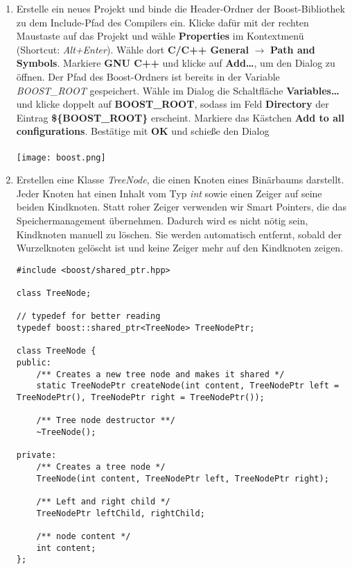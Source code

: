 \begin{enumerate}
\item
Erstelle ein neues Projekt und binde die Header-Ordner der Boost-Bibliothek zu dem Include-Pfad des Compilers ein.
Klicke dafür mit der rechten Maustaste auf das Projekt und wähle \textbf{Properties} im Kontextmenü (Shortcut: \emph{Alt+Enter}).
Wähle dort \textbf{C/C++ General} $\rightarrow$ \textbf{Path and Symbols}. Markiere \textbf{GNU C++} und klicke auf \textbf{Add\dots}, um den Dialog zu öffnen.
Der Pfad des Boost-Ordners ist bereits in der Variable \emph{BOOST\_ROOT} gespeichert.
Wähle im Dialog die Schaltfläche \textbf{Variables\dots} und klicke doppelt auf \textbf{BOOST\_ROOT}, sodass im Feld \textbf{Directory} der Eintrag \textbf{\$\{BOOST\_ROOT\}} erscheint.
Markiere das Kästchen \textbf{Add to all configurations}.
Bestätige mit \textbf{OK} und schieße den Dialog\\\\
\texttt{[image: boost.png]}

\item Erstellen eine Klasse \emph{TreeNode}, die einen Knoten eines Binärbaums darstellt.
Jeder Knoten hat einen Inhalt vom Typ \emph{int} sowie einen Zeiger auf seine beiden Kindknoten.
Statt \glqq roher\grqq{} Zeiger verwenden wir Smart Pointers, die das Speichermanagement übernehmen.
Dadurch wird es nicht nötig sein, Kindknoten manuell zu löschen.
Sie werden automatisch entfernt, sobald der Wurzelknoten gelöscht ist und keine Zeiger mehr auf den Kindknoten zeigen.

\begin{lstlisting}
#include <boost/shared_ptr.hpp>

class TreeNode;

// typedef for better reading
typedef boost::shared_ptr<TreeNode> TreeNodePtr;

class TreeNode {
public:
	/** Creates a new tree node and makes it shared */
	static TreeNodePtr createNode(int content, TreeNodePtr left = TreeNodePtr(), TreeNodePtr right = TreeNodePtr());

	/** Tree node destructor **/
	~TreeNode();

private:
	/** Creates a tree node */
	TreeNode(int content, TreeNodePtr left, TreeNodePtr right);

	/** Left and right child */
	TreeNodePtr leftChild, rightChild;

	/** node content */
	int content;
};
\end{lstlisting}


\end{enumerate}
